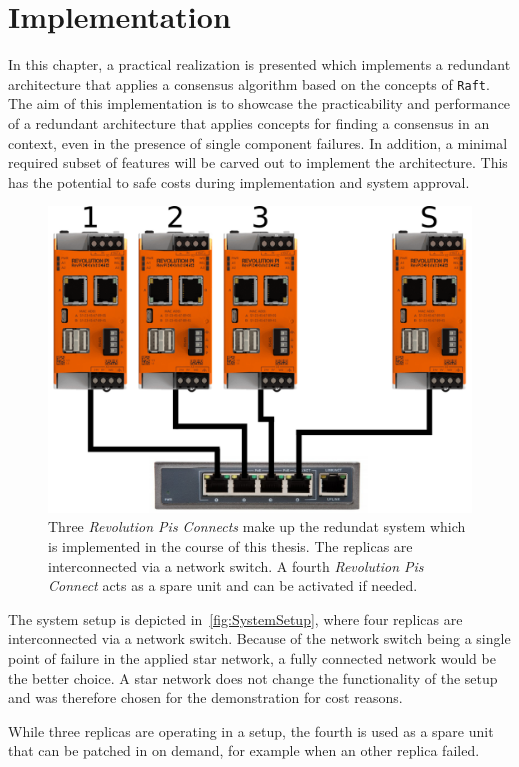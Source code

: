 \chapter{Implementation}
\label{cpt:Implementation}

In this chapter, a practical realization is presented which implements a redundant architecture that applies a consensus algorithm based on the concepts of \texttt{Raft}.
The aim of this implementation is to showcase the practicability and performance of a redundant architecture that applies  concepts for finding a consensus in an  context, even in the presence of single component failures.
In addition, a minimal required subset of  features will be carved out to implement the architecture.
This has the potential to safe costs during implementation and system approval.
\\

\begin{figure}[!hb]
	\centering
	\includegraphics[width=0.7\linewidth]{images/setup}
	\caption{Three \textit{Revolution Pis Connects} make up the redundat system which is implemented in the course of this thesis. The replicas are interconnected via a network switch. A fourth \textit{Revolution Pis Connect} acts as a spare unit and can be activated if needed.}
	\label{fig:SystemSetup}
\end{figure}

The system setup is depicted in~\autoref{fig:SystemSetup}, where four replicas are interconnected via a network switch.
Because of the network switch being a single point of failure in the applied star network, a fully connected network would be the better choice.
A star network does not change the functionality of the setup and was therefore chosen for the demonstration for cost reasons.

While three replicas are operating in a  setup, the fourth is used as a spare unit that can be patched in on demand, for example when an other replica failed.

